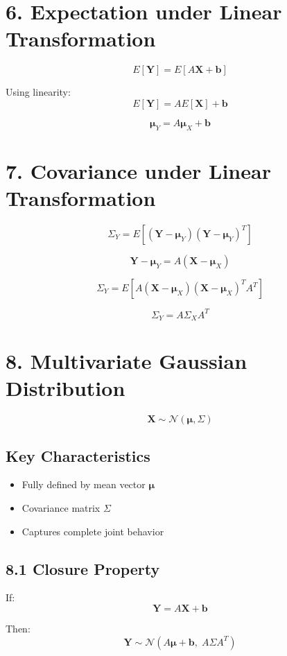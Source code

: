 \documentclass[12pt]{article}
\begin{document}
\section*{6. Expectation under Linear Transformation}

\[
E[\mathbf{Y}] = E[A\mathbf{X} + \mathbf{b}]
\]

Using linearity:
\[
E[\mathbf{Y}] = A E[\mathbf{X}] + \mathbf{b}
\]

\[
\boxed{\boldsymbol{\mu}_Y = A \boldsymbol{\mu}_X + \mathbf{b}}
\]

\section*{7. Covariance under Linear Transformation}

\[
\Sigma_Y = E[(\mathbf{Y} - \boldsymbol{\mu}_Y)(\mathbf{Y} - \boldsymbol{\mu}_Y)^T]
\]

\[
\mathbf{Y} - \boldsymbol{\mu}_Y = A(\mathbf{X} - \boldsymbol{\mu}_X)
\]

\[
\Sigma_Y = E[A(\mathbf{X} - \boldsymbol{\mu}_X)(\mathbf{X} - \boldsymbol{\mu}_X)^T A^T]
\]

\[
\boxed{\Sigma_Y = A \Sigma_X A^T}
\]

\section*{8. Multivariate Gaussian Distribution}

\[
\mathbf{X} \sim \mathcal{N}(\boldsymbol{\mu}, \Sigma)
\]

\subsection*{Key Characteristics}
\begin{itemize}
\item Fully defined by mean vector $\boldsymbol{\mu}$
\item Covariance matrix $\Sigma$
\item Captures complete joint behavior
\end{itemize}

\subsection*{8.1 Closure Property}

If:
\[
\mathbf{Y} = A\mathbf{X} + \mathbf{b}
\]

Then:
\[
\mathbf{Y} \sim \mathcal{N}(A\boldsymbol{\mu} + \mathbf{b},\; A\Sigma A^T)
\]
\end{document}
